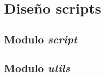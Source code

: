 \chapter{Diseño scripts}
\label{cap:diseño_scripts}

\section{Modulo \textit{script}}
\label{sec:modulo_script}


% 

\section{Modulo \textit{utils}}
\label{sec:modulo_utils}


